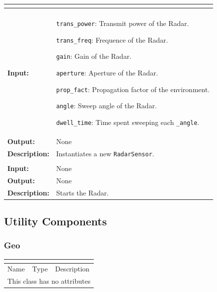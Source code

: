 \documentclass[titlepage]{article}
\renewenvironment{itemize*}
    {\begin{itemize}
        \setlength{\itemsep}{0pt}%
        \setlength{\parskip}{0pt}%
        \setlength{\partopsep}{0pt}%
        \setlength{\topsep}{0pt}}%
    {\end{itemize}}
\newcommand{\operations}[1]{
\begin{center}
    \begin{longtable}{|p{4cm}|p{10cm + 2.0\tabcolsep}|}
    \hline
    \multicolumn{2}{|l|}{\cellcolor[gray]{0.5}{\textbf{Operations}}} \\ \hline
#1
    \end{longtable}
\end{center}
}
\newcommand{\operation}[4]{
    \hline
    \multicolumn{2}{|l|}{\cellcolor[gray]{0.8}{\texttt{#1}}} \\ \hline
    \hspace{7pt}\textbf{Input:} & #2 \\ \hline
    \hspace{7pt}\textbf{Output:} & #3 \\ \hline
    \hspace{7pt}\textbf{Description:} & #4 \\ \hline
}
\newcommand{\noattributes}{
    \begin{center}
        \begin{tabular}{|p{3cm}|p{3cm}|p{8cm}|}
            \multicolumn{3}{|l|}{\cellcolor[gray]{0.5}{\textbf{Attributes}}} \\ \hline
            \rowcolor[gray]{0.8} Name & Type & Description \\ \hline 
            \multicolumn{3}{|c|}{This class has no attributes} \\ \hline
        \end{tabular}
    \end{center}
}
\begin{document}
\operations
{
    \operation{\_\_init\_\_(trans\_power, trans\_freq, gain, aperature, prop\_fact, dwell\_time, angle)}{
        \begin{itemize*}
            \item \texttt{trans\_power}: Transmit power of the Radar.
            \item \texttt{trans\_freq}: Frequence of the Radar.
            \item \texttt{gain}: Gain of the Radar.
            \item \texttt{aperture}: Aperture of the Radar.
            \item \texttt{prop\_fact}: Propagation factor of the environment.
            \item \texttt{angle}: Sweep angle of the Radar.
            \item \texttt{dwell\_time}: Time spent sweeping each \texttt{\_angle}.
        \end{itemize*}}{None}{Instantiates a new \texttt{RadarSensor}.}
    \operation{run()}{None}{None}{Starts the Radar.}
}

\subsection{Utility Components}
\subsubsection{Geo}

\noattributes
\end{document}
